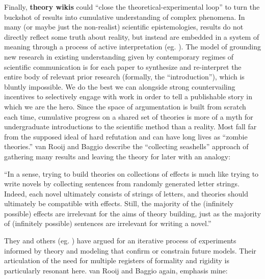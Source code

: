 Finally, \textbf{theory wikis} could ``close the
theoretical-experimental loop'' to turn the buckshot of results into
cumulative understanding of complex phenomena. In many (or maybe just
the non-realist) scientific epistemologies, results do not directly
reflect some truth about reality, but instead are embedded in a system
of meaning through a process of active interpretation (eg. \citep{meehlTheoreticalRisksTabular1978, cartwrightHowLawsPhysics1983a} ).
The model of grounding new research in existing understanding given by
contemporary regimes of scientific communication is for each paper to
synthesize and re-interpret the entire body of relevant prior research
(formally, the ``introduction''), which is bluntly impossible. We do the
best we can alongside strong countervailing incentives to selectively
engage with work in order to tell a publishable story in which we are
the hero. Since the space of argumentation is built from scratch each
time, cumulative progress on a shared set of theories is more of a myth
for undergraduate introductions to the scientific method than a reality.
Most fall far from the supposed ideal of hard refutation and can have
long lives as ``zombie theories.'' van Rooij and Baggio describe the
``collecting seashells'' approach of gathering many results and leaving
the theory for later with an analogy:

\begin{leftbar}
``In a sense, trying to build theories on collections of effects is much
like trying to write novels by collecting sentences from randomly
generated letter strings. Indeed, each novel ultimately consists of
strings of letters, and theories should ultimately be compatible with
effects. Still, the majority of the (infinitely possible) effects are
irrelevant for the aims of theory building, just as the majority of
(infinitely possible) sentences are irrelevant for writing a novel.''
\citep{vanrooijTheoryTestHow2021} 
\end{leftbar}

They and others (eg. \citep{guestHowComputationalModeling2021} )
have argued for an iterative process of experiments informed by theory
and modeling that confirm or constrain future models. Their articulation
of the need for multiple registers of formality and rigidity is
particularly resonant here. van Rooij and Baggio again, emphasis mine:

